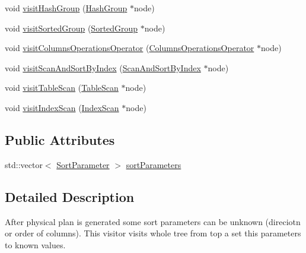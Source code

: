 \begin{DoxyCompactItemize}
\item 
void \hyperlink{classrafe_1_1_sort_resolving_physical_operator_visitor_ab2ed3da0ba8c7ba6c6f57af128b93979}{visit\+Hash\+Group} (\hyperlink{classrafe_1_1_hash_group}{Hash\+Group} $\ast$node)
\item 
void \hyperlink{classrafe_1_1_sort_resolving_physical_operator_visitor_a236a97d59e960a5612758f97342758c8}{visit\+Sorted\+Group} (\hyperlink{classrafe_1_1_sorted_group}{Sorted\+Group} $\ast$node)
\item 
void \hyperlink{classrafe_1_1_sort_resolving_physical_operator_visitor_a6ad430ddefd7a5f9f5a393d76dabc6db}{visit\+Columns\+Operations\+Operator} (\hyperlink{classrafe_1_1_columns_operations_operator}{Columns\+Operations\+Operator} $\ast$node)
\item 
void \hyperlink{classrafe_1_1_sort_resolving_physical_operator_visitor_a14698876ca3eae58a6f40f1e0d0dca13}{visit\+Scan\+And\+Sort\+By\+Index} (\hyperlink{classrafe_1_1_scan_and_sort_by_index}{Scan\+And\+Sort\+By\+Index} $\ast$node)
\item 
void \hyperlink{classrafe_1_1_sort_resolving_physical_operator_visitor_a5d481f69e9982db492fc899693cf1714}{visit\+Table\+Scan} (\hyperlink{classrafe_1_1_table_scan}{Table\+Scan} $\ast$node)
\item 
void \hyperlink{classrafe_1_1_sort_resolving_physical_operator_visitor_a751dc6fc9c39542497d85b866549c895}{visit\+Index\+Scan} (\hyperlink{classrafe_1_1_index_scan}{Index\+Scan} $\ast$node)
\end{DoxyCompactItemize}
\subsection*{Public Attributes}
\begin{DoxyCompactItemize}
\item 
std\+::vector$<$ \hyperlink{classrafe_1_1_sort_parameter}{Sort\+Parameter} $>$ \hyperlink{classrafe_1_1_sort_resolving_physical_operator_visitor_a47bd7f1cd17bf27e8313f77683413929}{sort\+Parameters}
\end{DoxyCompactItemize}


\subsection{Detailed Description}
After physical plan is generated some sort parameters can be unknown (direciotn or order of columns). This visitor visits whole tree from top a set this parameters to known values. 

